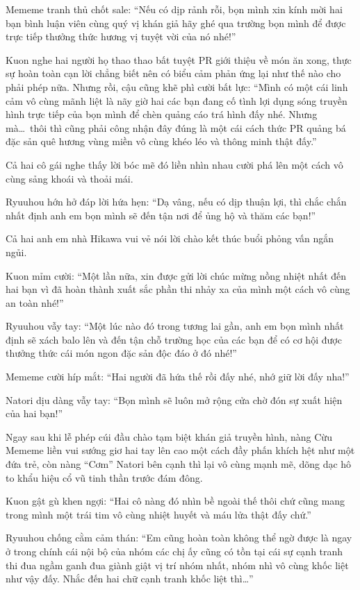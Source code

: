 \documentclass[../main.tex]{subfiles}
\begin{document}
Mememe tranh thủ chốt sale: ``Nếu có dịp rảnh rỗi, bọn mình xin kính mời hai bạn bình luận viên cùng quý vị khán giả hãy ghé qua trường bọn mình để được trực tiếp thưởng thức hương vị tuyệt vời của nó nhé!''

Kuon nghe hai người họ thao thao bất tuyệt PR giới thiệu về món ăn xong, thực sự hoàn toàn cạn lời chẳng biết nên có biểu cảm phản ứng lại như thế nào cho phải phép nữa. Nhưng rồi, cậu cũng khẽ phì cười bất lực: ``Mình có một cái linh cảm vô cùng mãnh liệt là nãy giờ hai các bạn đang cố tình lợi dụng sóng truyền hình trực tiếp của bọn mình để chèn quảng cáo trá hình đấy nhé. Nhưng mà\dots\ thôi thì cũng phải công nhận đây đúng là một cái cách thức PR quảng bá đặc sản quê hương vùng miền vô cùng khéo léo và thông minh thật đấy.''

Cả hai cô gái nghe thấy lời bóc mẽ đó liền nhìn nhau cười phá lên một cách vô cùng sảng khoái và thoải mái.

Ryuuhou hớn hở đáp lời hứa hẹn: ``Dạ vâng, nếu có dịp thuận lợi, thì chắc chắn nhất định anh em bọn mình sẽ đến tận nơi để ủng hộ và thăm các bạn!''

Cả hai anh em nhà Hikawa vui vẻ nói lời chào kết thúc buổi phỏng vấn ngắn ngủi.

Kuon mỉm cười: ``Một lần nữa, xin được gửi lời chúc mừng nồng nhiệt nhất đến hai bạn vì đã hoàn thành xuất sắc phần thi nhảy xa của mình một cách vô cùng an toàn nhé!''

Ryuuhou vẫy tay: ``Một lúc nào đó trong tương lai gần, anh em bọn mình nhất định sẽ xách balo lên và đến tận chỗ trường học của các bạn để có cơ hội được thưởng thức cái món ngon đặc sản độc đáo ở đó nhé!''

Mememe cười híp mắt: ``Hai người đã hứa thế rồi đấy nhé, nhớ giữ lời đấy nha!''

Natori dịu dàng vẫy tay: ``Bọn mình sẽ luôn mở rộng cửa chờ đón sự xuất hiện của hai bạn!''

Ngay sau khi lễ phép cúi đầu chào tạm biệt khán giả truyền hình, nàng Cừu Mememe liền vui sướng giơ hai tay lên cao một cách đầy phấn khích hệt như một đứa trẻ, còn nàng ``Cơm'' Natori bên cạnh thì lại vô cùng mạnh mẽ, dõng dạc hô to khẩu hiệu cổ vũ tinh thần trước đám đông.

Kuon gật gù khen ngợi: ``Hai cô nàng đó nhìn bề ngoài thế thôi chứ cũng mang trong mình một trái tim vô cùng nhiệt huyết và máu lửa thật đấy chứ.''

Ryuuhou chống cằm cảm thán: ``Em cũng hoàn toàn không thể ngờ được là ngay ở trong chính cái nội bộ của nhóm các chị ấy cũng có tồn tại cái sự cạnh tranh thi đua ngầm ganh đua giành giật vị trí nhóm nhất, nhóm nhì vô cùng khốc liệt như vậy đấy. Nhắc đến hai chữ cạnh tranh khốc liệt thì\dots''
\end{document}
